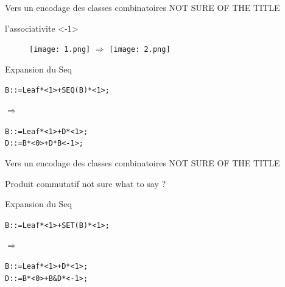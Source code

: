 \documentclass{beamer}
\begin{document}
\begin{frame}{Vers un encodage des classes combinatoires NOT SURE OF THE TITLE}


\begin{block}{l’associativite <-1>}
\begin{figure}[h]
  \centering
  \texttt{[image: 1.png]}
  $\Rightarrow$
  \texttt{[image: 2.png]}
\end{figure}

\end{block}
\begin{block}{Expansion du Seq}
\begin{alltt}
B ::= Leaf * <1> + SEQ(B) * <1> ; \\
\end{alltt}
\vspace{0.2cm}
$\Rightarrow$
\begin{minipage}{0.7\textwidth}
\begin{alltt}
B ::= Leaf * <1> + D * <1>; \\
D ::= B * <0> + D * B <-1>;
\end{alltt}
\end{minipage}
\end{block}

\end{frame}



\begin{frame}{Vers un encodage des classes combinatoires NOT SURE OF THE TITLE}


\begin{block}{Produit commutatif}
not sure what to say ?

\end{block}
\begin{block}{Expansion du Seq}
\begin{alltt}
B ::= Leaf * <1> + SET(B) * <1> ; \\
\end{alltt}
\vspace{0.2cm}
$\Rightarrow$
\begin{minipage}{0.7\textwidth}
\begin{alltt}
B ::= Leaf * <1> + D * <1>; \\
D::=B * <0> + B \& D * <-1>;
\end{alltt}
\end{minipage}
\end{block}
\end{frame}
\end{document}

